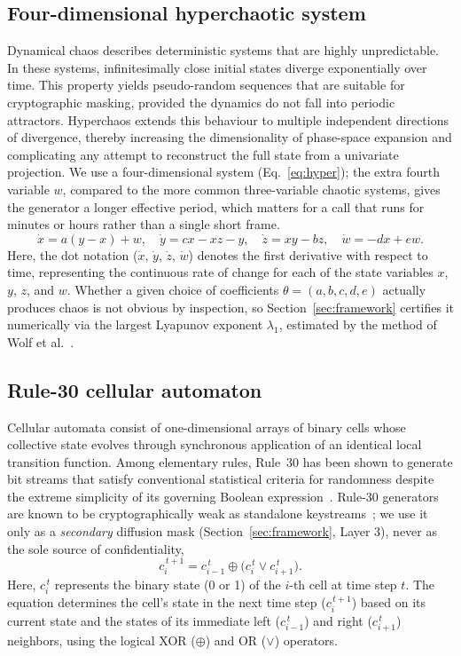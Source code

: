 \documentclass[pdflatex,sn-mathphys-num]{sn-jnl}%
\theoremstyle{thmstyleone}%
\theoremstyle{thmstyletwo}%
\theoremstyle{thmstylethree}%
\begin{document}
\subsection{Four-dimensional hyperchaotic system}
\label{sec:hyper}
Dynamical chaos describes deterministic systems that are highly unpredictable. In these systems, infinitesimally close initial states diverge exponentially over time. This property yields pseudo-random sequences that are suitable for cryptographic masking, provided the dynamics do not fall into periodic attractors. Hyperchaos extends this behaviour to multiple independent directions of divergence, thereby increasing the dimensionality of phase-space expansion and complicating any attempt to reconstruct the full state from a univariate projection. We use a four-dimensional system (Eq.~\eqref{eq:hyper}); the extra fourth variable $w$, compared to the more common three-variable chaotic systems, gives the generator a longer effective period, which matters for a call that runs for minutes or hours rather than a single short frame.
\begin{equation}
\dot{x}=a(y-x)+w,\quad \dot{y}=cx-xz-y,\quad \dot{z}=xy-bz,\quad \dot{w}=-dx+ew.
\label{eq:hyper}
\end{equation}
Here, the dot notation ($\dot{x}$, $\dot{y}$, $\dot{z}$, $\dot{w}$) denotes the first derivative with respect to time, representing the continuous rate of change for each of the state variables $x$, $y$, $z$, and $w$. Whether a given choice of coefficients $\theta=(a,b,c,d,e)$ actually produces chaos is not obvious by inspection, so Section~\ref{sec:framework} certifies it numerically via the largest Lyapunov exponent $\lambda_1$, estimated by the method of Wolf et al.~\cite{wolf1985}.

\subsection{Rule-30 cellular automaton}
\label{sec:rule30}
Cellular automata consist of one-dimensional arrays of binary cells whose
collective state evolves through synchronous application of an identical local
transition function. Among elementary rules, Rule~30 has been shown to generate
bit streams that satisfy conventional statistical criteria for randomness
despite the extreme simplicity of its governing Boolean expression~\cite{wolfram2002}.
Rule-30 generators are known to be cryptographically weak as standalone keystreams~\cite{meier1991}; we use it only as a \emph{secondary} diffusion mask (Section~\ref{sec:framework}, Layer 3), never as the sole source of confidentiality, 
\begin{equation}
c_i^{\,t+1} = c_{i-1}^{\,t} \oplus \big(c_i^{\,t} \vee c_{i+1}^{\,t}\big).
\label{eq:rule30}
\end{equation}
Here, $c_i^{\,t}$ represents the binary state (0 or 1) of the $i$-th cell at time step $t$. The equation determines the cell's state in the next time step ($c_i^{\,t+1}$) based on its current state and the states of its immediate left ($c_{i-1}^{\,t}$) and right ($c_{i+1}^{\,t}$) neighbors, using the logical XOR ($\oplus$) and OR ($\vee$) operators.
\end{document}
